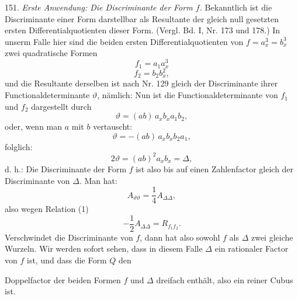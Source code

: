 151. \textit{Erste Anwendung: Die Discriminante der Form $f$.} Bekanntlich ist die Discriminante einer Form darstellbar als Resultante der gleich null gesetzten ersten Differentialquotienten dieser Form. (Vergl. Bd. I, Nr. 173 und 178.) In unserm Falle hier sind die beiden ersten Differentialquotienten von $f = a_x^3 = b_x^3$ zwei quadratische Formen
\[
f_1 = a_1 a_x^3
\]
\[
f_2 = b_2 b_x^2,
\]
und die Resultante derselben ist nach Nr. 129 gleich der Discriminante ihrer Functionaldeterminante $\vartheta$, nämlich:
Nun ist die Functionaldeterminante von $f_1$ und $f_2$ dargestellt durch
\[
\vartheta = (ab)\,a_x b_x a_1 b_2,
\]
oder, wenn man $a$ mit $b$ vertauscht:
\[
\vartheta = -(ab)\,a_x b_x b_2 a_1,
\]
folglich:
\[
2\vartheta = (ab)^2 a_x b_x = \Delta,
\]
d. h.: \glqq Die Discriminante der Form $f$ ist also bis auf einen Zahlenfactor gleich der Discriminante von $\Delta$.\grqq{}
Man hat:
\[
A_{\vartheta\vartheta} = \frac{1}{4}A_{\Delta\Delta},
\]
also wegen Relation (1)
\[
-\frac{1}{2}A_{\Delta\Delta} = R_{f_1f_2}.
\]
Verschwindet die Discriminante von $f$, dann hat also sowohl $f$ als $\Delta$ zwei gleiche Wurzeln. Wir werden sofort sehen, dass in diesem Falle $\Delta$ ein rationaler Factor von $f$ ist, und dass die Form $Q$ den


Doppelfactor der beiden Formen $f$ und $\Delta$ dreifach enthält, also ein reiner Cubus ist.

